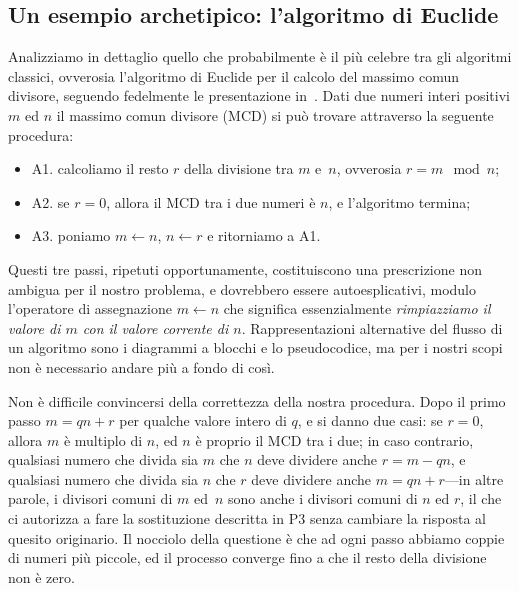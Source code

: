 \subsection{Un esempio archetipico: l'algoritmo di Euclide}
\label{sec:euclid_algorithm}

Analizziamo in dettaglio quello che probabilmente \`e il pi\`u celebre tra gli algoritmi
classici, ovverosia l'algoritmo di Euclide per il calcolo del massimo comun divisore,
seguendo fedelmente le presentazione in~\cite{taocp1}. Dati due numeri interi positivi
$m$ ed $n$ il massimo comun divisore (MCD) si pu\`o trovare attraverso la seguente
procedura:
\begin{itemize}
  \item[] A1. calcoliamo il resto $r$ della divisione tra $m$ e~$n$, ovverosia $r = m \mod n$;
  \item[] A2. se $r = 0$, allora il MCD tra i due numeri \`e $n$, e l'algoritmo termina;
  \item[] A3. poniamo $m \leftarrow n$, $n \leftarrow r$ e ritorniamo a A1.
\end{itemize}
Questi tre passi, ripetuti opportunamente, costituiscono una prescrizione non ambigua
per il nostro problema, e dovrebbero essere autoesplicativi, modulo l'operatore di
assegnazione $m \leftarrow n$ che significa essenzialmente \emph{rimpiazziamo il valore
di $m$ con il valore corrente di $n$}. Rappresentazioni alternative del flusso di
un algoritmo sono i diagrammi a blocchi e lo pseudocodice, ma per i nostri scopi
non \`e necessario andare pi\`u a fondo di cos\`i.

Non \`e difficile convincersi della correttezza della nostra procedura. Dopo il
primo passo $m = qn + r$ per qualche valore intero di $q$, e si danno due casi:
se $r = 0$, allora $m$ \`e multiplo di $n$, ed $n$ \`e proprio il MCD tra i due;
in caso contrario, qualsiasi numero che divida sia $m$ che $n$ deve dividere anche
$r = m - qn$, e qualsiasi numero che divida sia $n$ che $r$ deve dividere anche
$m = qn + r$---in altre parole, i divisori comuni di $m$ ed~$n$ sono anche i divisori
comuni di $n$ ed $r$, il che ci autorizza a fare la sostituzione descritta in P3
senza cambiare la risposta al quesito originario. Il nocciolo della questione \`e
che ad ogni passo abbiamo coppie di numeri pi\`u piccole, ed il processo converge
fino a che il resto della divisione non \`e zero.

